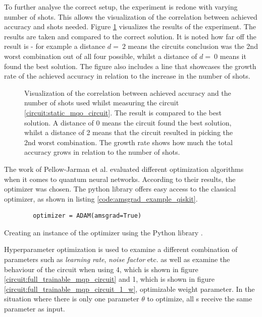 To further analyse the correct setup, the experiment is redone with varying number of shots. This allows the visualization of the correlation between achieved accuracy and shots needed. Figure \ref{figure:correlation_accuracy_shots} visualizes the results of the experiment. The results are taken and compared to the correct solution. It is noted how far off the result is - for example a distance $d =\ 2$ means the circuits conclusion was the 2nd worst combination out of all four possible, whilst a distance of $d =\ 0$ means it found the best solution. The figure also includes a line that showcases the growth rate of the achieved accuracy in relation to the increase in the number of shots.

\begin{figure}[!ht]
    \centering
    \scalebox{0.6}{
        
    }
    \caption{Visualization of the correlation between achieved accuracy and the number of shots used whilst measuring the circuit \ref{circuit:static_mqo_circuit}. The result is compared to the best solution. A distance of 0 means the circuit found the best solution, whilst a distance of 2 means that the circuit resulted in picking the 2nd worst combination. The growth rate shows how much the total accuracy grows in relation to the number of shots.}
    \label{figure:correlation_accuracy_shots}
\end{figure}

\newpage

The work of Pellow-Jarman et al.\cite{pellow-jarman_comparison_2021} evaluated different optimization algorithms when it comes to quantum neural networks. According to their results, the  optimizer was chosen. The python library  offers easy access to the classical optimizer, as shown in listing \ref{code:amsgrad_example_qiskit}.

\begin{listing}[!h]
    \centering
    \begin{verbatim}
        optimizer = ADAM(amsgrad=True)
    \end{verbatim}
    \caption{Creating an instance of the  optimizer using the Python library .}
    \label{code:amsgrad_example_qiskit}
\end{listing}

Hyperparameter optimization is used to examine a different combination of parameters such as \emph{learning rate}, \emph{noise factor} etc. as well as examine the behaviour of the circuit when using 4, which is shown in figure \ref{circuit:full_trainable_mqp_circuit} and 1, which is shown in figure \ref{circuit:full_trainable_mqp_circuit_1_w}, optimizable weight parameter. In the situation where there is only one parameter $\theta$ to optimize, all \rxgate s receive the same parameter as input.

